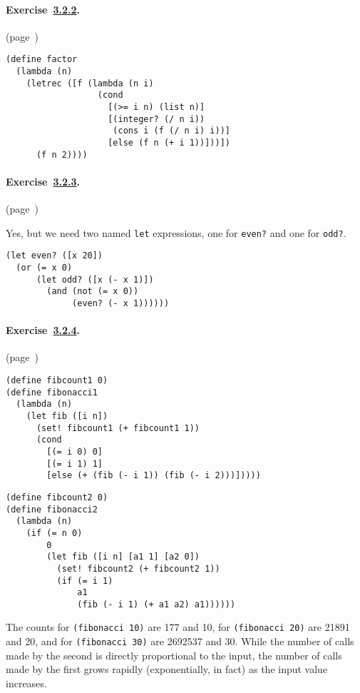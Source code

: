 \paragraph{Exercise \hyperref[further_g57]{3.2.2}. }(page \pageref{further_s53})

  
\begin{alltt}
 (define factor
   (lambda (n)
     (letrec ([f (lambda (n i)
                   (cond
                     [(\textgreater{}= i n) (list n)]
                     [(integer? (/ n i))
                      (cons i (f (/ n i) i))]
                     [else (f n (+ i 1))]))])
       (f n 2))))
\end{alltt}



\paragraph{Exercise \hyperref[further_g58]{3.2.3}. }(page \pageref{further_s55})

  Yes, but we need two named \texttt{let} expressions, one for \texttt{even?} and one for \texttt{odd?}. 
\begin{alltt}
(let even? ([x 20])
   (or (= x 0)
       (let odd? ([x (- x 1)])
         (and (not (= x 0))
              (even? (- x 1))))))
\end{alltt}



\paragraph{Exercise \hyperref[further_g59]{3.2.4}. }(page \pageref{further_s56})

  
\begin{alltt}
 (define fibcount1 0)
 (define fibonacci1
   (lambda (n)
     (let fib ([i n])
       (set! fibcount1 (+ fibcount1 1))
       (cond
         [(= i 0) 0]
         [(= i 1) 1]
         [else (+ (fib (- i 1)) (fib (- i 2)))])))) 

(define fibcount2 0)
 (define fibonacci2
   (lambda (n)
     (if (= n 0)
         0
         (let fib ([i n] [a1 1] [a2 0])
           (set! fibcount2 (+ fibcount2 1))
           (if (= i 1)
               a1
               (fib (- i 1) (+ a1 a2) a1))))))
\end{alltt}

The counts for \texttt{(fibonacci 10)} are 177 and 10, for \texttt{(fibonacci 20)} are 21891 and 20, and for \texttt{(fibonacci 30)} are 2692537 and 30. While the number of calls made by the second is directly proportional to the input, the number of calls made by the first grows rapidly (exponentially, in fact) as the input value increases. 


